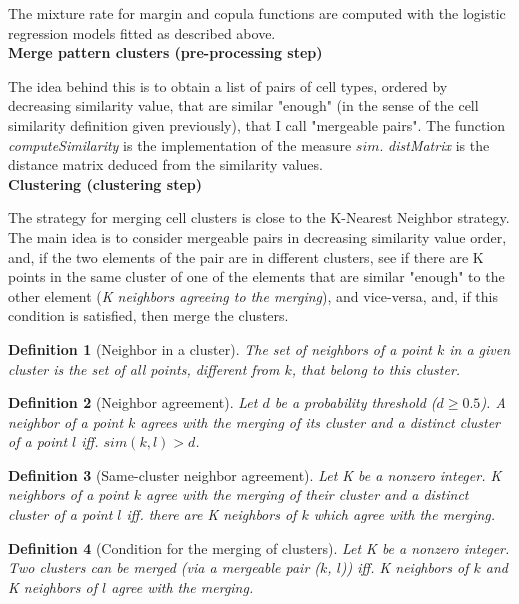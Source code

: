 \documentclass{report}
\newtheorem{definition}{Definition}[section]
\begin{document}
{The mixture rate for margin and copula functions are computed with the logistic regression models fitted as described above.\\

\bigskip
\noindent \textbf{Merge pattern clusters (pre-processing step)}
\bigskip

The idea behind this is to obtain a list of pairs of cell types, ordered by decreasing similarity value, that are similar "enough" (in the sense of the cell similarity definition given previously), that I call "mergeable pairs". The function \emph{computeSimilarity} is the implementation of the measure $sim$. \emph{distMatrix} is the distance matrix deduced from the similarity values.\\

\bigskip
\noindent \textbf{Clustering (clustering step)}
\bigskip

The strategy for merging cell clusters is close to the K-Nearest Neighbor strategy. The main idea is to consider mergeable pairs in decreasing similarity value order, and, if the two elements of the pair are in different clusters, see if there are K points in the same cluster of one of the elements that are similar "enough" to the other element (\textit{K neighbors agreeing to the merging}), and vice-versa, and, if this condition is satisfied, then merge the clusters.\\

\begin{definition}[Neighbor in a cluster]\label{neighbor}{The set of neighbors of a point $k$ in a given cluster is the set of all points, different from $k$, that belong to this cluster.}\end{definition}

\begin{definition}[Neighbor agreement]\label{neighboragreement}{Let $d$ be a probability threshold ($d \geq 0.5$). A neighbor of a point $k$ agrees with the merging of its cluster and a distinct cluster of a point $l$ iff. $sim(k,l) > d$.}\end{definition}

\begin{definition}[Same-cluster neighbor agreement]\label{neighborsagreement}{Let K be a nonzero integer. K neighbors of a point $k$ agree with the merging of their cluster and a distinct cluster of a point $l$ iff. there are K neighbors of $k$ which agree with the merging.}\end{definition}

\begin{definition}[Condition for the merging of clusters]\label{mergingclusters}{Let K be a nonzero integer. Two clusters can be merged (via a mergeable pair ($k$, $l$)) iff. K neighbors of $k$ and K neighbors of $l$ agree with the merging.}\end{definition}

}
\end{document}
